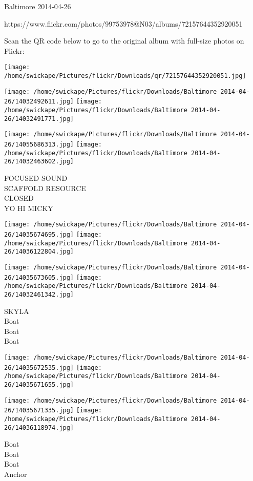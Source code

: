 \documentclass[10pt,letterpaper]{article}
\begin{document}
Baltimore 2014-04-26

https://www.flickr.com/photos/99753978@N03/albums/72157644352920051

Scan the QR code below to go to the original album with full-size photos on Flickr:

\texttt{[image: /home/swickape/Pictures/flickr/Downloads/qr/72157644352920051.jpg]}
\pagebreak

\texttt{[image: /home/swickape/Pictures/flickr/Downloads/Baltimore 2014-04-26/14032492611.jpg]}
\texttt{[image: /home/swickape/Pictures/flickr/Downloads/Baltimore 2014-04-26/14032491771.jpg]}

\texttt{[image: /home/swickape/Pictures/flickr/Downloads/Baltimore 2014-04-26/14055686313.jpg]}
\texttt{[image: /home/swickape/Pictures/flickr/Downloads/Baltimore 2014-04-26/14032463602.jpg]}

FOCUSED SOUND\\
SCAFFOLD RESOURCE\\
CLOSED\\
YO HI MICKY\\
\pagebreak

\texttt{[image: /home/swickape/Pictures/flickr/Downloads/Baltimore 2014-04-26/14035674695.jpg]}
\texttt{[image: /home/swickape/Pictures/flickr/Downloads/Baltimore 2014-04-26/14036122804.jpg]}

\texttt{[image: /home/swickape/Pictures/flickr/Downloads/Baltimore 2014-04-26/14035673605.jpg]}
\texttt{[image: /home/swickape/Pictures/flickr/Downloads/Baltimore 2014-04-26/14032461342.jpg]}

SKYLA\\
Boat\\
Boat\\
Boat\\
\pagebreak

\texttt{[image: /home/swickape/Pictures/flickr/Downloads/Baltimore 2014-04-26/14035672535.jpg]}
\texttt{[image: /home/swickape/Pictures/flickr/Downloads/Baltimore 2014-04-26/14035671655.jpg]}

\texttt{[image: /home/swickape/Pictures/flickr/Downloads/Baltimore 2014-04-26/14035671335.jpg]}
\texttt{[image: /home/swickape/Pictures/flickr/Downloads/Baltimore 2014-04-26/14036118974.jpg]}

Boat\\
Boat\\
Boat\\
Anchor\\
\pagebreak
\end{document}
